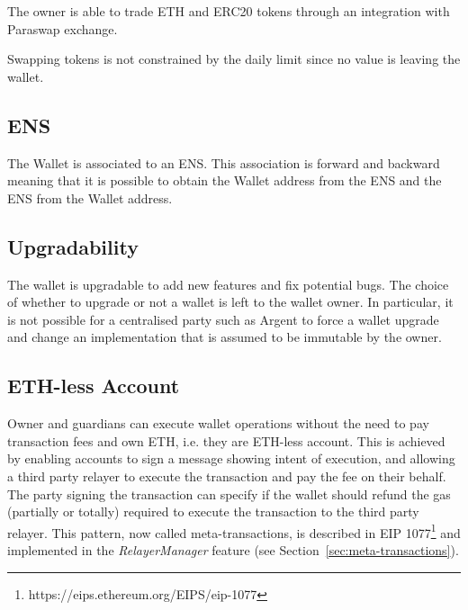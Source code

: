 \documentclass[12pt]{article}
\begin{document}
The owner is able to trade ETH and ERC20 tokens through an integration with Paraswap exchange.

Swapping tokens is not constrained by the daily limit since no value is leaving the wallet.

\subsection{ENS}

The Wallet is associated to an ENS. This association is forward and backward meaning that it is possible to obtain the Wallet address from the ENS and the ENS from the Wallet address.

\subsection{Upgradability}

The wallet is upgradable to add new features and fix potential bugs. The choice of whether to upgrade or not a wallet is left to the wallet owner. In particular, it is not possible for a centralised party such as Argent to force a wallet upgrade and change an implementation that is assumed to be immutable by the owner.

\subsection{ETH-less Account}
\label{sec:eth-less-account}

Owner and guardians can execute wallet operations without the need to pay transaction fees and own ETH, i.e. they are ETH-less account. This is achieved by enabling accounts to sign a message showing intent of execution, and allowing a third party relayer to execute the transaction and pay the fee on their behalf. The party signing the transaction can specify if the wallet should refund the gas (partially or totally) required to execute the transaction to the third party relayer. This pattern, now called meta-transactions, is described in EIP 1077\footnote{https://eips.ethereum.org/EIPS/eip-1077} and implemented in the \emph{RelayerManager} feature (see Section~\ref{sec:meta-transactions}). 
\end{document}
